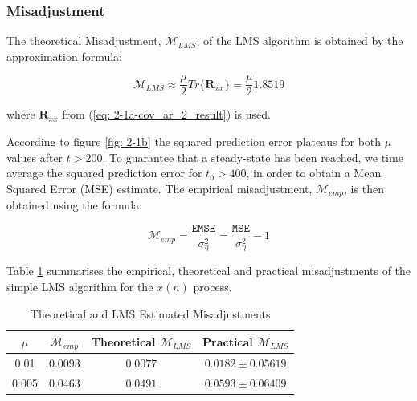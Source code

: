 \documentclass[12pt]{article}
\begin{document}
		\subsubsection{Misadjustment}
			
			The theoretical Misadjustment, $\mathcal{M}_{LMS}$, of the LMS algorithm is obtained by the approximation formula:
			
			\begin{equation}
			\mathcal{M}_{LMS} \approx \frac{\mu}{2} Tr\big\{ \mathbf{R}_{xx} \big\} = \frac{\mu}{2} 1.8519
			\end{equation}
			
			where $\mathbf{R}_{xx}$ from (\ref{eq: 2-1a-cov_ar_2_result}) is used.
			
			According to figure \ref{fig: 2-1b} the squared prediction error plateaus for both $\mu$ values after $t > 200$. To guarantee that a steady-state has been reached, we time average the squared prediction error for $t_{0} > 400$, in order to obtain a Mean Squared Error (MSE) estimate. The empirical misadjustment, $\mathcal{M}_{emp}$,
			is then obtained using the formula:
			
			\begin{equation}
			\mathcal{M}_{emp} = \frac{\mathtt{EMSE}}{\sigma_{\eta}^{2}} = \frac{\mathtt{MSE}}{\sigma_{\eta}^{2}} -1
			\end{equation}
			
			Table \ref{tab: 2-1c} summarises the empirical, theoretical and practical misadjustments of the simple LMS algorithm for the $x(n)$ process.
						
			\begin{table}[H]
				\centering
				\begin{tabular}{|c|c|c||c|}
					\hline
					\textbf{$\mu$} & \textbf{$\mathcal{M}_{emp}$} & Theoretical \textbf{$\mathcal{M}_{LMS}$} & Practical \textbf{$\mathcal{M}_{LMS}$} \\
					\hline
					0.01 & $0.0093$ & $0.0077$ & $0.0182 \pm 0.05619$ \\
					\hline
					0.005 & $0.0463$ & $0.0491$ & $0.0593 \pm 0.06409$ \\
					\hline
				\end{tabular}
				\captionsetup{justification=centering}
				\caption{Theoretical and LMS Estimated Misadjustments}
				\label{tab: 2-1c}
			\end{table}
		
\end{document}
